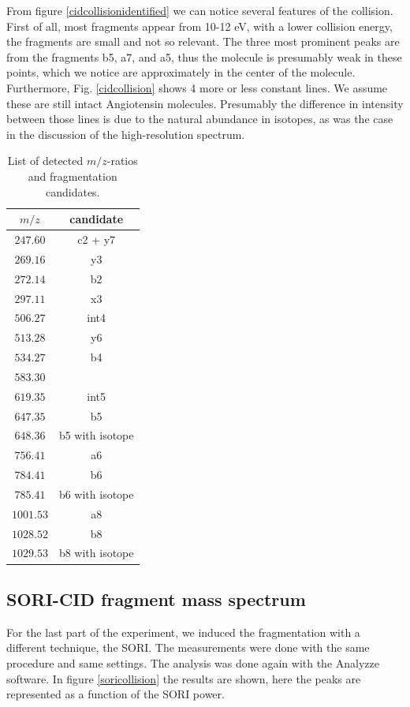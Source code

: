\documentclass[a4paper,10pt]{article}
\begin{document}
From figure \ref{cidcollisionidentified} we can notice several features of the collision. First of all, most fragments appear from 10-12 eV, with a lower collision energy, the fragments are small and not so relevant. The three most prominent peaks are from the fragments b5, a7, and a5, thus the molecule is presumably weak in these points, which we notice are approximately in the center of the molecule.  \\
Furthermore, Fig. \ref{cidcollision} shows 4 more or less constant lines. We assume these are still intact Angiotensin molecules. Presumably the difference in intensity between those lines is due to the natural abundance in isotopes, as was the case in the discussion of the high-resolution spectrum. \\
 

\begin{table}
	\centering
	\caption{List of detected $m/z$-ratios and fragmentation candidates.  }
	\begin{tabular}{c | c }
		$m / z$ & candidate \\ \hline
		$247.60$ & c2 + y7\\ 
		$269.16$ & y3 \\
		$272.14$ & b2 \\
		$297.11$ & x3 \\
		$506.27$ & int4 \\
		$513.28$ & y6 \\
		$534.27$ & b4 \\
		$583.30$ & \\
		$619.35$ & int5 \\
		$647.35$ & b5 \\
		$648.36$ & b5 with isotope \\
		$756.41$ & a6 \\
		$784.41$ & b6 \\
		$785.41$ & b6 with isotope \\
		$1001.53$ & a8 \\
		$1028.52$ & b8 \\ 
		$1029.53$ & b8 with isotope \\
	\end{tabular}
\end{table}

\subsection{SORI-CID fragment mass spectrum}
For the last part of the experiment, we induced the fragmentation with a different technique, the SORI. The measurements were done with the same procedure and same settings. The analysis was done again with the Analyzze software. In figure \ref{soricollision} the results are shown, here the peaks are represented as a function of the SORI power.
\end{document}
